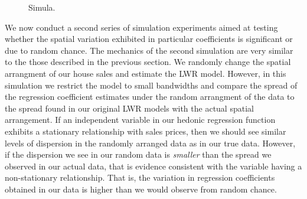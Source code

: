 \documentclass{article}\usepackage{graphicx, color}
\begin{document}
\begin{figure}
 \caption{Simula.}\label{fig:NoiseBetas}
\end{figure}

We now conduct a second series of simulation experiments aimed at testing whether the spatial variation exhibited in particular coefficients is significant or due to random chance. The mechanics of the second simulation are very similar to the those described in the previous section. We randomly change the spatial arrangment of our house sales and estimate the LWR model. However, in this simulation we restrict the model to small bandwidths and compare the spread of the regression coefficient estimates under the random arrangment of the data to the spread found in our original LWR models with the actual spatial arrangement. If an independent variable in our hedonic regression function exhibits a stationary relationship with sales prices, then we should see similar levels of dispersion in the randomly arranged data as in our true data. However, if the dispersion we see in our random data is \emph{smaller} than the spread we observed in our actual data, that is evidence consistent with the variable having a non-stationary relationship. That is, the variation in regression coefficients obtained in our data is higher than we would observe from random chance. 
\end{document}
